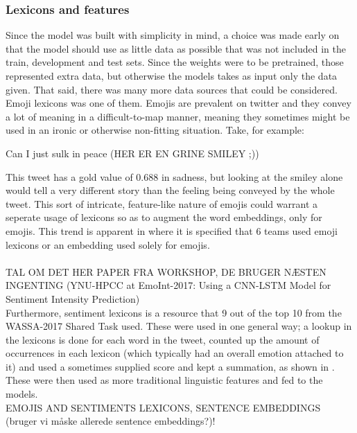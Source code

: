 \subsubsection{Lexicons and features}
Since the model was built with simplicity in mind, a choice was made early on that the model should use as little data as possible that was not included in the train, development and test sets. Since the weights were to be pretrained, those represented extra data, but otherwise the models takes as input only the data given. That said, there was many more data sources that could be considered.\\
Emoji lexicons was one of them. Emojis are prevalent on twitter and they convey a lot of meaning in a difficult-to-map manner, meaning they sometimes might be used in an ironic or otherwise non-fitting situation. Take, for example:\\
\begin{center}
Can I just sulk in peace %
(HER ER EN GRINE SMILEY ;))
\end{center}
This tweet has a gold value of 0.688 in sadness, but looking at the smiley alone would tell a very different story than the feeling being conveyed by the whole tweet. This sort of intricate, feature-like nature of emojis could warrant a seperate usage of lexicons so as to augment the word embeddings, only for emojis. This trend is apparent in \cite{wassa2017} where it is specified that 6 teams used emoji lexicons or an embedding used solely for emojis.\\
\\
TAL OM DET HER PAPER FRA WORKSHOP, DE BRUGER NÆSTEN INGENTING (YNU-HPCC at EmoInt-2017: Using a CNN-LSTM Model for Sentiment Intensity Prediction)\\
Furthermore, sentiment lexicons is a resource that 9 out of the top 10 from the WASSA-2017 Shared Task used. These were used in one general way; a lookup in the lexicons is done for each word in the tweet, counted up the amount of occurrences in each lexicon (which typically had an overall emotion attached to it) and used a sometimes supplied score and kept a summation, as shown in \cite{seernet}. These were then used as more traditional linguistic features and fed to the models.\\
EMOJIS AND SENTIMENTS LEXICONS, SENTENCE EMBEDDINGS (bruger vi måske allerede sentence embeddings?)!